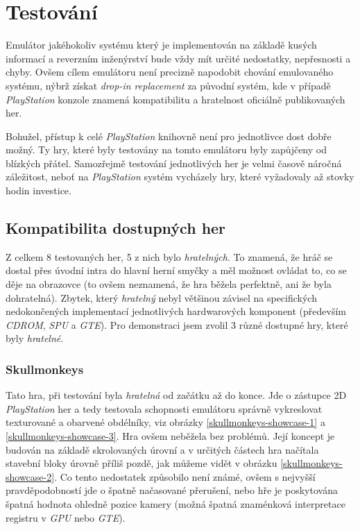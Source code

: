 \chapter{Testování}

Emulátor jakéhokoliv systému který je implementován na základě kusých informací a reverzním inženýrství
bude vždy mít určité nedostatky, nepřesnosti a chyby. Ovšem cílem emulátoru není precizně napodobit chování
emulovaného systému, nýbrž získat \textit{drop-in replacement} za původní systém, kde v případě \textit{PlayStation}
konzole znamená kompatibilitu a hratelnost oficiálně publikovaných her.

Bohužel, přístup k celé \textit{PlayStation} knihovně není pro jednotlivce dost dobře možný. Ty hry, které byly testovány
na tomto emulátoru byly zapůjčeny od blízkých přátel. Samozřejmě testování jednotlivých her je velmi časově náročná
záležitost, neboť na \textit{PlayStation} systém vycházely hry, které vyžadovaly až stovky hodin investice.

\section{Kompatibilita dostupných her}

Z celkem 8 testovaných her, 5 z nich bylo \textit{hratelných}. To znamená, že hráč se dostal přes úvodní intra do hlavní
herní smyčky a měl možnost ovládat to, co se děje na obrazovce (to ovšem neznamená, že hra běžela perfektně, ani že byla dohratelná). Zbytek, který \textit{hratelný} nebyl většinou závisel na specifických 
nedokončených implementací jednotlivých hardwarových komponent (především \textit{CDROM}, \textit{SPU} a \textit{GTE}).
Pro demonstraci jsem zvolil 3 různé dostupné hry, které byly \textit{hratelné}.

\subsection{Skullmonkeys}

Tato hra, při testování byla \textit{hratelná} od začátku až do konce. Jde o zástupce 2D \textit{PlayStation} her
a tedy testovala schopnosti emulátoru správně vykreslovat texturované a obarvené obdélníky, viz obrázky \ref{skullmonkeys-showcase-1} a \ref{skullmonkeys-showcase-3}.
Hra ovšem neběžela bez problémů. Její koncept je budován na základě skrolovaných úrovní a v určitých částech
hra načítala stavební bloky úrovně příliš pozdě, jak můžeme vidět v obrázku \ref{skullmonkeys-showcase-2}. Co tento nedostatek způsobilo není známé, ovšem
s nejvyšší pravděpodobností jde o špatně načasované přerušení, nebo hře je poskytována špatná hodnota
ohledně pozice kamery (možná špatná znaménková interpretace registru v \textit{GPU} nebo \textit{GTE}). 


